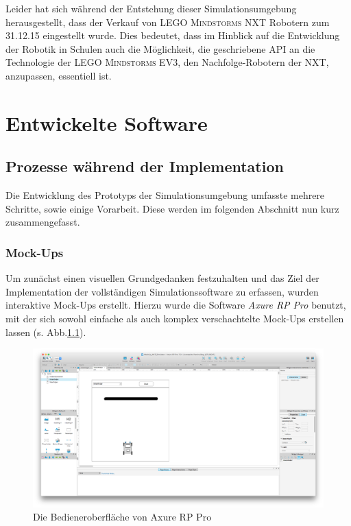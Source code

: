 \documentclass[paper=a4, pagesize, DIV=calc, BCOR=15.5mm, twoside=on, onecolumn=on, open = right, titlepage =on, parskip =half-, headsepline = on, footsepline = on, chapterprefix = on, appendixprefix = off, fontsize = 12pt, numbers = noenddot, abstract = on]{scrbook}
\numberwithin{equation}{chapter}
\theoremstyle{definition}
\theoremstyle{plain}
\theoremstyle{plain}
\theoremstyle{remark}
\theoremstyle{plain}
\theoremstyle{plain}
\begin{document}
Leider hat sich während der Entstehung dieser Simulationsumgebung herausgestellt, dass der Verkauf von \textsc{LEGO Mindstorms} NXT Robotern zum 31.12.15 eingestellt wurde. Dies bedeutet, dass im Hinblick auf die Entwicklung der Robotik in Schulen auch die Möglichkeit, die geschriebene API an die Technologie der \textsc{LEGO Mindstorms} EV3, den Nachfolge-Robotern der NXT, anzupassen, essentiell ist.


\par \singlespacing
\chapter{Entwickelte Software}
\onehalfspacing
\par \singlespacing
\section{Prozesse während der Implementation}
\onehalfspacing
Die Entwicklung des Prototyps der Simulationsumgebung umfasste mehrere Schritte, sowie einige Vorarbeit. Diese werden im folgenden Abschnitt nun kurz zusammengefasst.
\par \singlespacing
\subsection{Mock-Ups} 
\onehalfspacing
Um zunächst einen visuellen Grundgedanken festzuhalten und das Ziel der Implementation der vollständigen Simulationssoftware zu erfassen, wurden interaktive Mock-Ups erstellt. Hierzu wurde die Software \emph{Axure RP Pro} benutzt, mit der sich sowohl einfache als auch komplex verschachtelte Mock-Ups erstellen lassen (s. Abb.\ref{fig:axure}).

\begin{figure}[htbp]
\centering
\includegraphics[scale=0.2]{images/axure_mockup.png} 
\caption{Die Bedieneroberfläche von Axure RP Pro}
\label{fig:axure}
\end{figure}
\end{document}
